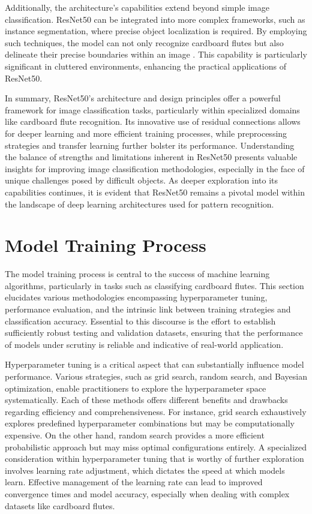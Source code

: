 Additionally, the architecture's capabilities extend beyond simple image classification. ResNet50 can be integrated into more complex frameworks, such as instance segmentation, where precise object localization is required. By employing such techniques, the model can not only recognize cardboard flutes but also delineate their precise boundaries within an image \cite{he2017mask}. This capability is particularly significant in cluttered environments, enhancing the practical applications of ResNet50.


In summary, ResNet50's architecture and design principles offer a powerful framework for image classification tasks, particularly within specialized domains like cardboard flute recognition. Its innovative use of residual connections allows for deeper learning and more efficient training processes, while preprocessing strategies and transfer learning further bolster its performance. Understanding the balance of strengths and limitations inherent in ResNet50 presents valuable insights for improving image classification methodologies, especially in the face of unique challenges posed by difficult objects. As deeper exploration into its capabilities continues, it is evident that ResNet50 remains a pivotal model within the landscape of deep learning architectures used for pattern recognition.

\section{Model Training Process}

The model training process is central to the success of machine learning algorithms, particularly in tasks such as classifying cardboard flutes. This section elucidates various methodologies encompassing hyperparameter tuning, performance evaluation, and the intrinsic link between training strategies and classification accuracy. Essential to this discourse is the effort to establish sufficiently robust testing and validation datasets, ensuring that the performance of models under scrutiny is reliable and indicative of real-world application.


Hyperparameter tuning is a critical aspect that can substantially influence model performance. Various strategies, such as grid search, random search, and Bayesian optimization, enable practitioners to explore the hyperparameter space systematically. Each of these methods offers different benefits and drawbacks regarding efficiency and comprehensiveness. For instance, grid search exhaustively explores predefined hyperparameter combinations but may be computationally expensive. On the other hand, random search provides a more efficient probabilistic approach but may miss optimal configurations entirely. A specialized consideration within hyperparameter tuning that is worthy of further exploration involves learning rate adjustment, which dictates the speed at which models learn. Effective management of the learning rate can lead to improved convergence times and model accuracy, especially when dealing with complex datasets like cardboard flutes.


